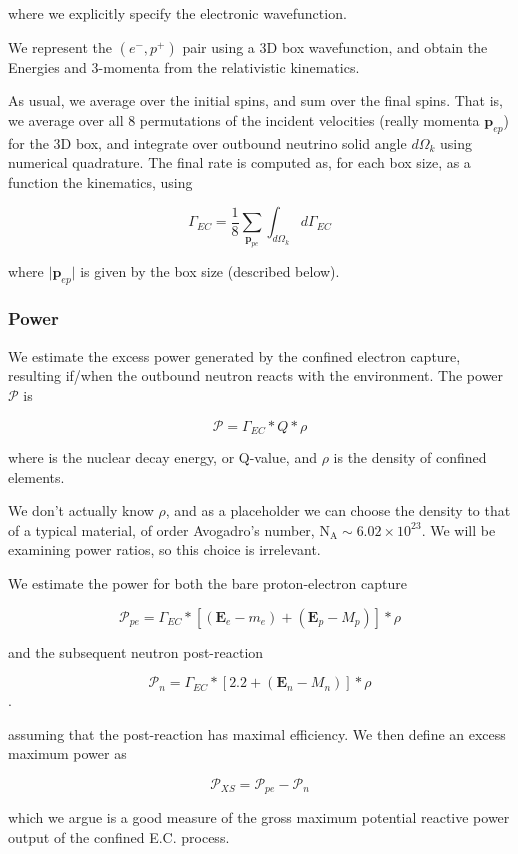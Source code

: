 \documentclass[%
 aip,
 jmp,%
 amsmath,amssymb,
 reprint,%
]{revtex4-1}
\begin{document}
where we explicitly specify the electronic wavefunction.

We represent the $(e^{-},p^{+})$ pair using a 3D box wavefunction, and obtain the Energies and 3-momenta from the relativistic kinematics.  

As usual, we average over the initial spins, and sum over the final spins.  That is, we average over all 8 permutations of the incident velocities (really momenta $\mathbf{p}_{ep}$) for the 3D box, and integrate over outbound neutrino solid angle $d\Omega_{k}$ using numerical quadrature.  The final rate is computed as, for each box size, as a function the kinematics, using

$$\Gamma_{EC}=\frac{1}{8}\sum_{\mathbf{p}_{pe}}\int_{d\Omega_{k}}d\Gamma_{EC}$$

where $\big\vert\mathbf{p}_{ep}\big\vert$ is given by the box size (described below).

\subsubsection{Power}

We  estimate the excess power generated by the confined electron capture, resulting if/when the outbound neutron reacts with the environment. 
The power $\mathcal{P}$ is

$$\mathcal{P}=\Gamma_{EC}*Q*\rho$$

where is the nuclear decay energy, or Q-value, and $\rho$ is the  density of confined elements.  

We don't actually know $\rho$, and as a placeholder we can choose the density to that of a typical material, of order Avogadro's number, $\mathrm{N_{A}}\sim6.02\times10^{23}$.  We will be examining power ratios, so this choice is irrelevant.

We estimate the power for both the bare proton-electron capture

$$\mathcal{P}_{pe}=\Gamma_{EC}*\left[(\mathbf{E}_{e}-m_{e})+(\mathbf{E}_{p}-M_{p})\right]*\rho$$

and the subsequent neutron post-reaction

$$\mathcal{P}_{n}=\Gamma_{EC}*\left[2.2+(\mathbf{E}_{n}-M_{n})\right]*\rho$$.

assuming that the post-reaction has maximal efficiency.  We then define an excess maximum power as

$$\mathcal{P}_{XS}=\mathcal{P}_{pe}-\mathcal{P}_{n}$$

which we argue is a good measure of the gross maximum potential reactive power output of the confined E.C. process. 
\end{document}
